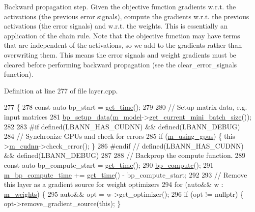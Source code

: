 Backward propagation step. Given the objective function gradients w.\+r.\+t. the activations (the previous error signals), compute the gradients w.\+r.\+t. the previous activations (the error signals) and w.\+r.\+t. the weights. This is essentially an application of the chain rule. Note that the objective function may have terms that are independent of the activations, so we add to the gradients rather than overwriting them. This means the error signals and weight gradients must be cleared before performing backward propagation (see the clear\+\_\+error\+\_\+signals function). 

Definition at line 277 of file layer.\+cpp.


\begin{DoxyCode}
277                       \{
278   \textcolor{keyword}{const} \textcolor{keyword}{auto} bp\_start = \hyperlink{namespacelbann_a478d36031ff0659893c4322cd856157f}{get\_time}();
279 
280   \textcolor{comment}{// Setup matrix data, e.g. input matrices}
281   \hyperlink{classlbann_1_1Layer_af7312710c0b9ac6ebe327d0ffe22cbf0}{bp\_setup\_data}(\hyperlink{classlbann_1_1Layer_a3d9315e99574166f2f33e37b572021d2}{m\_model}->\hyperlink{classlbann_1_1model_a3eaad8fd538b99ecab9afca6dc3327fd}{get\_current\_mini\_batch\_size}());
282 
283 \textcolor{preprocessor}{  #if defined(LBANN\_HAS\_CUDNN) && defined(LBANN\_DEBUG)}
284   \textcolor{comment}{// Synchronize GPUs and check for errors}
285   \textcolor{keywordflow}{if} (\hyperlink{classlbann_1_1Layer_af7881cb5eff5207c15fa835d65462e8f}{m\_using\_gpus}) \{ this->\hyperlink{classlbann_1_1Layer_a08dbb94239e3b8c96329786c57c72e21}{m\_cudnn}->check\_error(); \}
286 \textcolor{preprocessor}{  #endif // defined(LBANN\_HAS\_CUDNN) && defined(LBANN\_DEBUG)}
287 
288   \textcolor{comment}{// Backprop the compute function.}
289   \textcolor{keyword}{const} \textcolor{keyword}{auto} bp\_compute\_start = \hyperlink{namespacelbann_a478d36031ff0659893c4322cd856157f}{get\_time}();
290   \hyperlink{classlbann_1_1Layer_a7442e01f9ee1294df2de811efcf5171e}{bp\_compute}();
291   \hyperlink{classlbann_1_1Layer_ae28626457a58943b25e7a2920fc271f0}{m\_bp\_compute\_time} += \hyperlink{namespacelbann_a478d36031ff0659893c4322cd856157f}{get\_time}() - bp\_compute\_start;
292 
293   \textcolor{comment}{// Remove this layer as a gradient source for weight optimizers}
294   \textcolor{keywordflow}{for} (\textcolor{keyword}{auto}&& w : \hyperlink{classlbann_1_1Layer_a7954e30fbf9100a6ba4b56d02767a469}{m\_weights}) \{
295     \textcolor{keyword}{auto}&& opt = w->get\_optimizer();
296     \textcolor{keywordflow}{if} (opt != \textcolor{keyword}{nullptr}) \{ opt->remove\_gradient\_source(\textcolor{keyword}{this}); \}

\end{DoxyCode}
